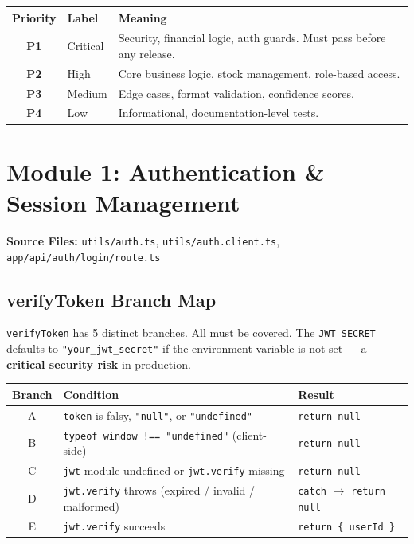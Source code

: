\documentclass[12pt,a4paper]{report}
\newcommand{\pone}{\textbf{\color{p1red}P1}}
\newcommand{\ptwo}{\textbf{\color{p2orange}P2}}
\newcommand{\pthree}{\textbf{\color{p3blue}P3}}
\newcommand{\pfour}{\textbf{\color{p4green}P4}}
\begin{document}
\begin{center}
\begin{tabular}{clp{9cm}}
  \toprule
  \textbf{Priority} & \textbf{Label} & \textbf{Meaning} \\
  \midrule
  \pone & Critical & Security, financial logic, auth guards. Must pass before any release. \\
  \ptwo & High     & Core business logic, stock management, role-based access. \\
  \pthree & Medium & Edge cases, format validation, confidence scores. \\
  \pfour & Low     & Informational, documentation-level tests. \\
  \bottomrule
\end{tabular}
\end{center}

\section{Module 1: Authentication \& Session Management}

\textbf{Source Files:} \texttt{utils/auth.ts}, \texttt{utils/auth.client.ts}, \texttt{app/api/auth/login/route.ts}

\subsection{verifyToken Branch Map}

\begin{tcolorbox}[warningbox,title={Security-Critical Function --- 5 Branches}]
\texttt{verifyToken} has 5 distinct branches. All must be covered. The \texttt{JWT\_SECRET} defaults to \texttt{"your\_jwt\_secret"} if the environment variable is not set --- a \textbf{critical security risk} in production.
\end{tcolorbox}

\begin{center}
\begin{tabular}{clp{7cm}}
  \toprule
  \textbf{Branch} & \textbf{Condition} & \textbf{Result} \\
  \midrule
  A & \texttt{token} is falsy, \texttt{"null"}, or \texttt{"undefined"} & \texttt{return null} \\
  B & \texttt{typeof window !== "undefined"} (client-side) & \texttt{return null} \\
  C & \texttt{jwt} module undefined or \texttt{jwt.verify} missing & \texttt{return null} \\
  D & \texttt{jwt.verify} throws (expired / invalid / malformed) & \texttt{catch} $\to$ \texttt{return null} \\
  E & \texttt{jwt.verify} succeeds & \texttt{return \{ userId \}} \\
  \bottomrule
\end{tabular}
\end{center}
\end{document}

